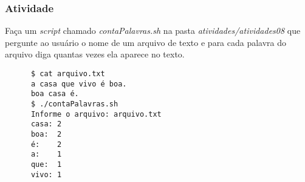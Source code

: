 \documentclass{beamer}
\begin{document}
   \begin{frame}[fragile]
      \frametitle{Atividade}
      Faça um \textit{script} chamado \textit{contaPalavras.sh} na pasta \textit{atividades/atividades08} que pergunte ao usuário o nome de um arquivo de texto e para cada palavra do arquivo diga quantas vezes ela aparece no texto. \\
      \begin{verbatim}
      $ cat arquivo.txt
      a casa que vivo é boa.
      boa casa é.
      $ ./contaPalavras.sh
      Informe o arquivo: arquivo.txt
      casa: 2
      boa:  2
      é:    2
      a:    1
      que:  1
      vivo: 1
      \end{verbatim}
\end{frame}
\end{document}
